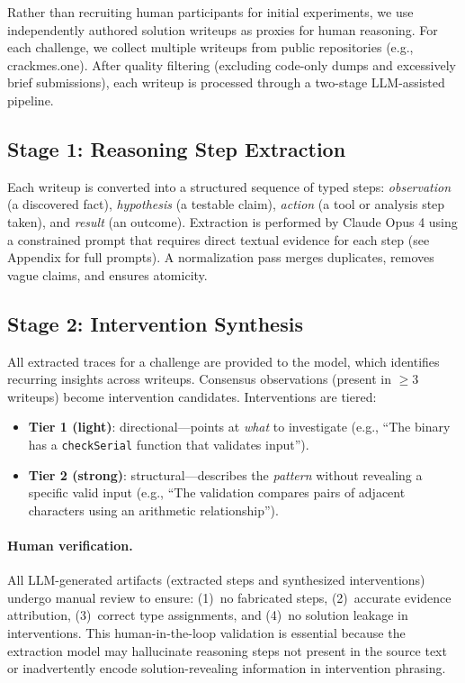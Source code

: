 \documentclass[letterpaper]{article}
\begin{document}
Rather than recruiting human participants for initial experiments, we use independently authored solution writeups as proxies for human reasoning.
For each challenge, we collect multiple writeups from public repositories (e.g., crackmes.one).
After quality filtering (excluding code-only dumps and excessively brief submissions), each writeup is processed through a two-stage LLM-assisted pipeline.

\subsection{Stage 1: Reasoning Step Extraction}

Each writeup is converted into a structured sequence of typed steps: \emph{observation} (a discovered fact), \emph{hypothesis} (a testable claim), \emph{action} (a tool or analysis step taken), and \emph{result} (an outcome).
Extraction is performed by Claude Opus 4 using a constrained prompt that requires direct textual evidence for each step (see Appendix for full prompts).
A normalization pass merges duplicates, removes vague claims, and ensures atomicity.

\subsection{Stage 2: Intervention Synthesis}

All extracted traces for a challenge are provided to the model, which identifies recurring insights across writeups.
Consensus observations (present in $\geq$3 writeups) become intervention candidates.
Interventions are tiered:

\begin{itemize}
    \item \textbf{Tier 1 (light)}: directional---points at \emph{what} to investigate (e.g., ``The binary has a \texttt{checkSerial} function that validates input'').
    \item \textbf{Tier 2 (strong)}: structural---describes the \emph{pattern} without revealing a specific valid input (e.g., ``The validation compares pairs of adjacent characters using an arithmetic relationship'').
\end{itemize}

\paragraph{Human verification.}
All LLM-generated artifacts (extracted steps and synthesized interventions) undergo manual review to ensure: (1)~no fabricated steps, (2)~accurate evidence attribution, (3)~correct type assignments, and (4)~no solution leakage in interventions.
This human-in-the-loop validation is essential because the extraction model may hallucinate reasoning steps not present in the source text or inadvertently encode solution-revealing information in intervention phrasing.
\end{document}
